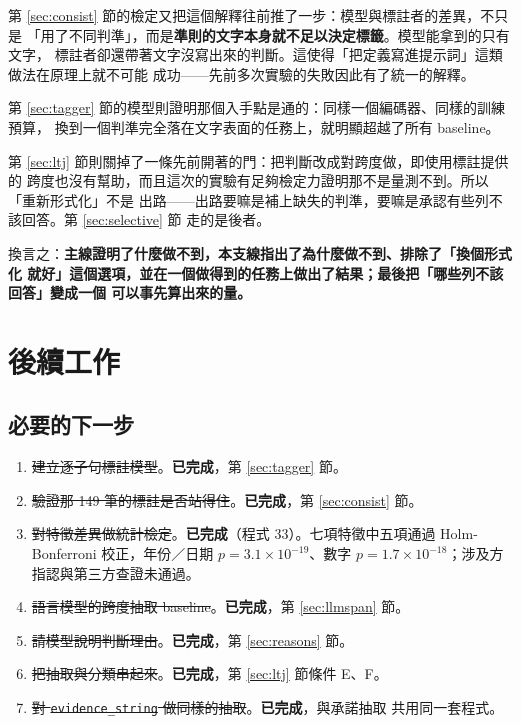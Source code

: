 \documentclass[11pt,a4paper]{ctexart}
\newcommand{\fn}[1]{\texttt{#1}}
\begin{document}
第 \ref{sec:consist} 節的檢定又把這個解釋往前推了一步：模型與標註者的差異，不只是
「用了不同判準」，而是\textbf{準則的文字本身就不足以決定標籤}。模型能拿到的只有文字，
標註者卻還帶著文字沒寫出來的判斷。這使得「把定義寫進提示詞」這類做法在原理上就不可能
成功——先前多次實驗的失敗因此有了統一的解釋。

第 \ref{sec:tagger} 節的模型則證明那個入手點是通的：同樣一個編碼器、同樣的訓練預算，
換到一個判準完全落在文字表面的任務上，就明顯超越了所有 baseline。

第 \ref{sec:ltj} 節則關掉了一條先前開著的門：把判斷改成對跨度做，即使用標註提供的
跨度也沒有幫助，而且這次的實驗有足夠檢定力證明那不是量測不到。所以「重新形式化」不是
出路——出路要嘛是補上缺失的判準，要嘛是承認有些列不該回答。第 \ref{sec:selective} 節
走的是後者。

\begin{tcolorbox}[colback=gray!8, colframe=gray!55]
換言之：\textbf{主線證明了什麼做不到，本支線指出了為什麼做不到、排除了「換個形式化
就好」這個選項，並在一個做得到的任務上做出了結果；最後把「哪些列不該回答」變成一個
可以事先算出來的量。}
\end{tcolorbox}

\section{後續工作}

\subsection{必要的下一步}

\begin{enumerate}[leftmargin=2em, itemsep=4pt]
  \item \sout{建立逐子句標註模型}。\textbf{已完成}，第 \ref{sec:tagger} 節。
  \item \sout{驗證那 149 筆的標註是否站得住}。\textbf{已完成}，第 \ref{sec:consist} 節。
  \item \sout{對特徵差異做統計檢定}。\textbf{已完成}（程式 33）。七項特徵中五項通過
        Holm-Bonferroni 校正，年份／日期 $p=3.1\times10^{-19}$、數字
        $p=1.7\times10^{-18}$；涉及方指認與第三方查證未通過。
  \item \sout{語言模型的跨度抽取 baseline}。\textbf{已完成}，第 \ref{sec:llmspan} 節。
  \item \sout{請模型說明判斷理由}。\textbf{已完成}，第 \ref{sec:reasons} 節。
  \item \sout{把抽取與分類串起來}。\textbf{已完成}，第 \ref{sec:ltj} 節條件 E、F。
  \item \sout{對 \fn{evidence\_string} 做同樣的抽取}。\textbf{已完成}，與承諾抽取
        共用同一套程式。
\end{enumerate}
\end{document}
